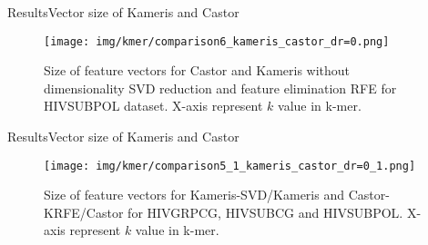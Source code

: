\documentclass[10pt]{beamer}
\newcommand{\1}{
        	\setbeamertemplate{background}{
        		\texttt{[image: img/1]}
        		\tikz[overlay] \fill[fill opacity=0.75,fill=white] (0,0) rectangle (-\paperwidth,\paperheight);
        	}
}
\begin{document}
\begin{frame}{Results}{Vector size of Kameris and Castor}
	\begin{figure}[h]
		\centering
		\texttt{[image: img/kmer/comparison6\_kameris\_castor\_dr=0.png]}
		\caption{Size of feature vectors for Castor and Kameris without dimensionality SVD reduction and feature elimination RFE for  HIVSUBPOL dataset. X-axis represent $k$ value in k-mer.}
		\label{fig:comparison3}
	\end{figure}
	
\end{frame}


\begin{frame}{Results}{Vector size of Kameris and Castor}
	\begin{figure}[h]
		\centering
		\texttt{[image: img/kmer/comparison5\_1\_kameris\_castor\_dr=0\_1.png]}
		\caption{Size of feature vectors for Kameris-SVD/Kameris and Castor-KRFE/Castor for HIVGRPCG, HIVSUBCG and  HIVSUBPOL. X-axis represent $k$ value in k-mer.}
		\label{fig:comparison4}
	\end{figure}
	
\end{frame}
\end{document}
